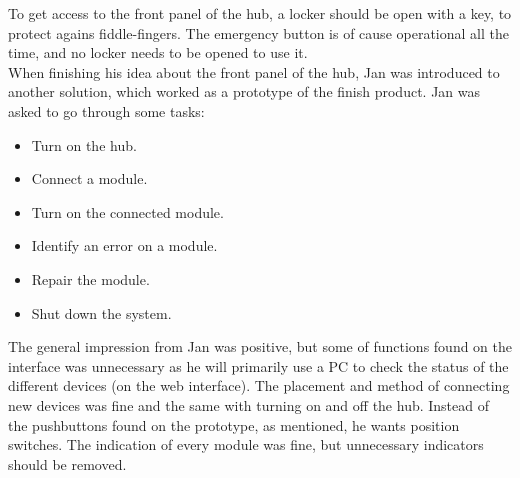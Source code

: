 To get access to the front panel of the hub, a locker should be open with a key, to protect agains fiddle-fingers. The emergency button is of cause operational all the time, and no locker needs to be opened to use it.
\\When finishing his idea about the front panel of the hub, Jan was introduced to another solution, which worked as a prototype of the finish product. Jan was asked to go through some tasks:
\begin{itemize}
	\item Turn on the hub.
	\item Connect a module.
	\item Turn on the connected module.
	\item Identify an error on a module.
	\item Repair the module.
	\item Shut down the system.
\end{itemize}
The general impression from Jan was positive, but some of functions found on the interface was unnecessary as he will primarily use a PC to check the status of the different devices (on the web interface). The placement and method of connecting new devices was fine and the same with turning on and off the hub. Instead of the pushbuttons found on the prototype, as mentioned, he wants position switches. The indication of every module was fine, but unnecessary indicators should be removed. 
